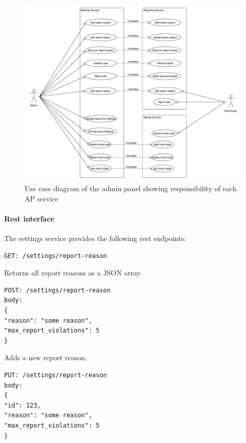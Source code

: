 \begin{figure}[!ht]
    \centering
    \includegraphics[width=1.0\textwidth]{./images/UseCaseDiagramAdminPanel}
    \caption{Use case diagram of the admin panel showing responsibility of each AP service}
    \label{fig:ucd}
\end{figure}

\paragraph{Rest interface}

The settings service provides the following rest endpoints:

\begin{lstlisting}[label={lst:lstlisting}]
GET: /settings/report-reason
\end{lstlisting}

Returns all report reasons as a JSON array.

\begin{lstlisting}[label={lst:lstlisting2}]
POST: /settings/report-reason
body:
{
"reason": "some reason",
"max_report_violations": 5
}
\end{lstlisting}

Adds a new report reason.

\begin{lstlisting}[label={lst:lstlisting3}]
PUT: /settings/report-reason
body:
{
"id": 123,
"reason": "some reason",
"max_report_violations": 5
}
\end{lstlisting}

